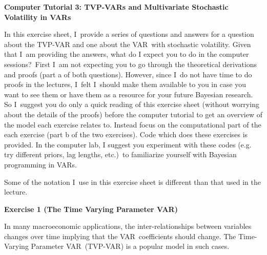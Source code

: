 \documentclass{article}
\begin{document}
\begin{center}
\textbf{Computer Tutorial 3: TVP-VARs and Multivariate Stochastic Volatility
in VARs}
\end{center}

In this exercise sheet, I\ provide a series of questions and answers for a
question about the TVP-VAR and one about the VAR\ with stochastic
volatility. Given that I\ am providing the answers, what do I expect you to
do in the computer sessions?\ First I\ am not expecting you to go through
the theoretical derivations and proofs (part a of both questions). However,
since I\ do not have time to do proofs in the lectures, I\ felt I\ should
make them available to you in case you want to see them or have them as a
resource for your future Bayesian research. So I\ suggest you do only a
quick reading of this exercise sheet (without worrying about the details of
the proofs) before the computer tutorial to get an overview of the model
each exercise relates to. Instead focus on the computational part of the
each exercise (part b of the two exercises). Code which does these exercises
is provided. In the computer lab, I suggest you experiment with these codes
(e.g. try different priors, lag lengths, etc.)\ to familiarize yourself with
Bayesian programming in VARs.

Some of the notation I\ use in this exercise sheet is different than that
used in the lecture.

\newpage 

\textbf{Exercise 1 (The Time Varying Parameter VAR)}

In many macroeconomic applications, the inter-relationships between
variables changes over time implying that the VAR\ coefficients should
change. The Time-Varying Parameter VAR\ (TVP-VAR) is a popular model in such
cases.
\end{document}

